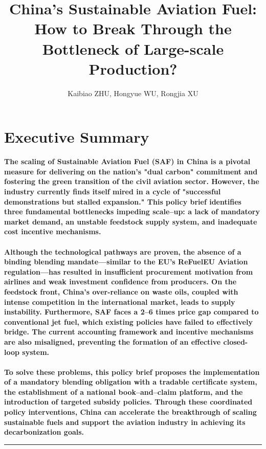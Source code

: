 \documentclass[a4paper,11pt]{article}
\title{\color{schoolblue}\textbf{China's Sustainable Aviation Fuel: How to Break Through the Bottleneck of Large-scale Production?}}
\author{Kaibiao ZHU, Hongyue WU, Rongjia XU}
\date{}
\begin{document}
\maketitle

\section*{Executive Summary}
\begin{tcolorbox}[summarystyle]
\textbf{The scaling of Sustainable Aviation Fuel (SAF) in China is a pivotal measure for delivering on the nation's "dual carbon" commitment and fostering the green transition of the civil aviation sector. However, the industry currently finds itself mired in a cycle of "successful demonstrations but stalled expansion." This policy brief identifies three fundamental bottlenecks impeding scale--up: a lack of mandatory market demand, an unstable feedstock supply system, and inadequate cost incentive mechanisms.\\
\\
Although the technological pathways are proven, the absence of a binding blending mandate---similar to the EU's ReFuelEU Aviation regulation---has resulted in insufficient procurement motivation from airlines and weak investment confidence from producers. On the feedstock front, China's over-reliance on waste oils, coupled with intense competition in the international market, leads to supply instability. Furthermore, SAF faces a 2--6 times price gap compared to conventional jet fuel, which existing policies have failed to effectively bridge. The current accounting framework and incentive mechanisms are also misaligned, preventing the formation of an effective closed-loop system.\\
\\
To solve these problems, this policy brief proposes the implementation of a mandatory blending obligation with a tradable certificate system, the establishment of a national book--and--claim platform, and the introduction of targeted subsidy policies. Through these coordinated policy interventions, China can accelerate the breakthrough of scaling sustainable fuels and support the aviation industry in achieving its decarbonization goals.}
\end{tcolorbox}

\vspace{1em}
\hrule
\vspace{1.5em}
\end{document}
